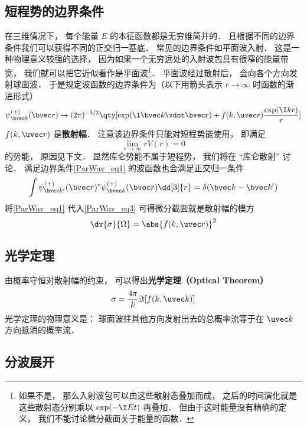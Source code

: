 \subsection{短程势的边界条件}
在三维情况下， 每个能量 $E$ 的本征函数都是无穷维简并的． 且根据不同的边界条件我们可以获得不同的正交归一基底． 常见的边界条件如平面波入射． 这是一种物理意义较强的选择， 因为如果一个无穷远处的入射波包具有很窄的能量带宽， 我们就可以把它近似看作是平面波\footnote{如果不是， 那么入射波包可以由这些散射态叠加而成， 之后的时间演化就是这些散射态分别乘以 $\exp(-\I E t)$ 再叠加． 但由于这时能量没有精确的定义， 我们不能讨论微分截面关于能量的函数．}． 平面波经过散射后， 会向各个方向发射球面波． 于是规定波函数的边界条件为（以下用箭头表示 $r\to\infty$ 时函数的渐进形式）
\begin{equation}\label{ParWav_eq1}
\psi_{\bvec k}^{(+)}(\bvec r) \rightarrow (2\pi)^{-3/2} \qty[\exp(\I \bvec k \vdot \bvec r) + f(k, \uvec r) \frac{\exp(\I k r)}{r}]
\end{equation}
$f(k, \uvec r)$ 是\textbf{散射幅}． 注意该边界条件只能对短程势能使用， 即满足
\begin{equation}
\lim_{r\to\infty} r V(r) = 0
\end{equation}
的势能， 原因见下文． 显然库仑势能不属于短程势， 我们将在 “库仑散射” 讨论． 满足边界条件\autoref{ParWav_eq1} 的波函数也会满足正交归一条件
\begin{equation}
\int \psi_{\bvec k'}^{(+)}(\bvec r)^* \psi_{\bvec k}^{(+)}(\bvec r) \dd[3]{r} = \delta(\bvec k - \bvec k')
\end{equation}
将\autoref{ParWav_eq1} 代入\autoref{ParWav_eq3} 可得微分截面就是散射幅的模方
\begin{equation}
\dv{\sigma}{\Omega} = \abs{f(k, \uvec r)}^2
\end{equation}

\subsection{光学定理}
由概率守恒对散射幅的约束， 可以得出\textbf{光学定理（Optical Theorem）}
\begin{equation}
\sigma = \frac{4\pi}{k} \Im[f(k, \uvec k)]
\end{equation}
光学定理的物理意义是： 球面波往其他方向发射出去的总概率流等于在 $\uvec k$ 方向抵消的概率流．

\subsection{分波展开}

